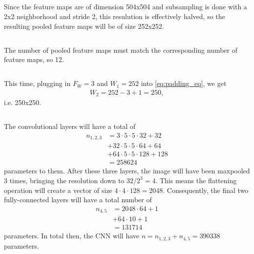 \documentclass[]{article}
\begin{document}
\subsection{}
Since the feature maps are of dimension 504x504 and subsampling is done with a 2x2 neighborhood and stride 2, this resulution is effectively halved, so the resulting pooled feature maps will be of size 252x252.

\subsection{}
The number of pooled feature maps must match the corresponding number of feature maps, so 12.

\subsection{}
This time, plugging in $F_W = 3$ and $W_1 = 252$ into \eqref{eq:padding_eq}, we get
\begin{equation}\begin{aligned}
W_2 = 252 - 3 + 1 = 250,
\end{aligned}\end{equation}
i.e. 250x250.

\subsection{}
The convolutional layers will have a total of
\begin{equation}\begin{aligned}
n_{1,2,3} &= 3 \cdot 5 \cdot 5 \cdot 32 + 32\\
&+ 32 \cdot 5 \cdot 5 \cdot 64 + 64 \\
&+ 64 \cdot 5 \cdot 5 \cdot 128 + 128 \\
&= 258624
\end{aligned}\end{equation}
parameters to them. After these three layers, the image will have been maxpooled 3 times, bringing the resolution down to $32 / 2^3 = 4$. This means the flattening operation will create a vector of size $4 \cdot 4 \cdot 128 = 2048$.
Consequently, the final two fully-connected layers will have a total number of
\begin{equation}\begin{aligned}
n_{4,5} &= 2048 \cdot 64 + 1\\
&+ 64 \cdot 10 + 1 \\
&= 131714
\end{aligned}\end{equation}
parameters. In total then, the CNN will have $n = n_{1,2,3} + n_{4,5} = 390338$ parameters.
\end{document}
